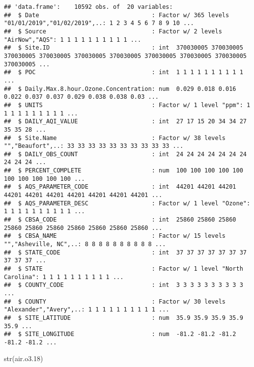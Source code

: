 \documentclass[
]{article}
\newenvironment{Shaded}{\begin{snugshade}}{\end{snugshade}}
\newcommand{\FloatTok}[1]{\textcolor[rgb]{0.00,0.00,0.81}{#1}}
\newcommand{\FunctionTok}[1]{\textcolor[rgb]{0.00,0.00,0.00}{#1}}
\newcommand{\NormalTok}[1]{#1}
\begin{document}
\begin{verbatim}
## 'data.frame':    10592 obs. of  20 variables:
##  $ Date                                : Factor w/ 365 levels "01/01/2019","01/02/2019",..: 1 2 3 4 5 6 7 8 9 10 ...
##  $ Source                              : Factor w/ 2 levels "AirNow","AQS": 1 1 1 1 1 1 1 1 1 1 ...
##  $ Site.ID                             : int  370030005 370030005 370030005 370030005 370030005 370030005 370030005 370030005 370030005 370030005 ...
##  $ POC                                 : int  1 1 1 1 1 1 1 1 1 1 ...
##  $ Daily.Max.8.hour.Ozone.Concentration: num  0.029 0.018 0.016 0.022 0.037 0.037 0.029 0.038 0.038 0.03 ...
##  $ UNITS                               : Factor w/ 1 level "ppm": 1 1 1 1 1 1 1 1 1 1 ...
##  $ DAILY_AQI_VALUE                     : int  27 17 15 20 34 34 27 35 35 28 ...
##  $ Site.Name                           : Factor w/ 38 levels "","Beaufort",..: 33 33 33 33 33 33 33 33 33 33 ...
##  $ DAILY_OBS_COUNT                     : int  24 24 24 24 24 24 24 24 24 24 ...
##  $ PERCENT_COMPLETE                    : num  100 100 100 100 100 100 100 100 100 100 ...
##  $ AQS_PARAMETER_CODE                  : int  44201 44201 44201 44201 44201 44201 44201 44201 44201 44201 ...
##  $ AQS_PARAMETER_DESC                  : Factor w/ 1 level "Ozone": 1 1 1 1 1 1 1 1 1 1 ...
##  $ CBSA_CODE                           : int  25860 25860 25860 25860 25860 25860 25860 25860 25860 25860 ...
##  $ CBSA_NAME                           : Factor w/ 15 levels "","Asheville, NC",..: 8 8 8 8 8 8 8 8 8 8 ...
##  $ STATE_CODE                          : int  37 37 37 37 37 37 37 37 37 37 ...
##  $ STATE                               : Factor w/ 1 level "North Carolina": 1 1 1 1 1 1 1 1 1 1 ...
##  $ COUNTY_CODE                         : int  3 3 3 3 3 3 3 3 3 3 ...
##  $ COUNTY                              : Factor w/ 30 levels "Alexander","Avery",..: 1 1 1 1 1 1 1 1 1 1 ...
##  $ SITE_LATITUDE                       : num  35.9 35.9 35.9 35.9 35.9 ...
##  $ SITE_LONGITUDE                      : num  -81.2 -81.2 -81.2 -81.2 -81.2 ...
\end{verbatim}

\begin{Shaded}
\begin{Highlighting}[]
\FunctionTok{str}\NormalTok{(air.o3}\FloatTok{.18}\NormalTok{)}
\end{Highlighting}
\end{Shaded}
\end{document}
